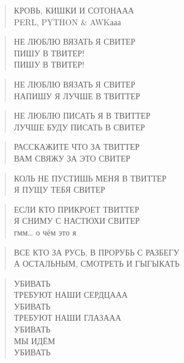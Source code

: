 \poemtitle{***}
\begin{verse}
КРОВЬ, КИШКИ И СОТОНААА\\
PERL, PYTHON \& AWKааа
\end{verse}

\poemtitle{***}
\begin{verse}
НЕ ЛЮБЛЮ ВЯЗАТЬ Я СВИТЕР\\
ПИШУ В ТВИТЕР!\\
ПИШУ В ТВИТЕР!
\end{verse}

\poemtitle{***}
\begin{verse}
НЕ ЛЮБЛЮ ВЯЗАТЬ Я СВИТЕР\\
НАПИШУ Я ЛУЧШЕ В ТВИТТЕР
\end{verse}

\poemtitle{***}
\begin{verse}
НЕ ЛЮБЛЮ ПИСАТЬ Я В ТВИТТЕР\\
ЛУЧШЕ БУДУ ПИСАТЬ В СВИТЕР
\end{verse}

\poemtitle{***}
\begin{verse}
РАССКАЖИТЕ ЧТО ЗА ТВИТТЕР\\
ВАМ СВЯЖУ ЗА ЭТО СВИТЕР
\end{verse}

\poemtitle{***}
\begin{verse}
КОЛЬ НЕ ПУСТИШЬ МЕНЯ В ТВИТТЕР\\
Я ПУЩУ ТЕБЯ СВИТЕР
\end{verse}

\poemtitle{***}
\begin{verse}
ЕСЛИ КТО ПРИКРОЕТ ТВИТТЕР\\
Я СНИМУ С НАСТЮХИ СВИТЕР\\
гмм… о чём это я
\end{verse}

\poemtitle{***}
\begin{verse}
ВСЕ КТО ЗА РУСЬ, В ПРОРУБЬ С РАЗБЕГУ\\
А ОСТАЛЬНЫМ, СМОТРЕТЬ И ГЫГЫКАТЬ
\end{verse}

\poemtitle{***}
\begin{verse}
УБИВАТЬ\\
ТРЕБУЮТ НАШИ СЕРДЦААА\\
УБИВАТЬ\\
ТРЕБУЮТ НАШИ ГЛАЗААА\\
УБИВАТЬ\\
МЫ ИДЁМ\\
УБИВАТЬ
\end{verse}

